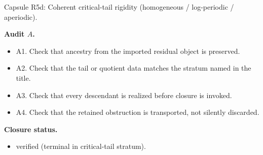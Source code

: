\documentclass[11pt]{amsart}
\newcommand{\capsulefield}[1]{\par\smallskip\noindent\textbf{#1.}\ }
\begin{document}
\begin{proofcapsule}{Capsule R5d: Coherent critical-tail rigidity (homogeneous / log-periodic / aperiodic).}
  \capsulefield{Audit \(A\)}
  \begin{itemize}[leftmargin=1.8em]
  \item A1. Check that ancestry from the imported residual object is preserved.
  \item A2. Check that the tail or quotient data matches the stratum named in the title.
  \item A3. Check that every descendant is realized before closure is invoked.
  \item A4. Check that the retained obstruction is transported, not silently discarded.
  \end{itemize}
  \capsulefield{Closure status}
  \begin{itemize}[leftmargin=1.8em]
  \item verified (terminal in critical-tail stratum).
  \end{itemize}
\end{proofcapsule}
\end{document}
